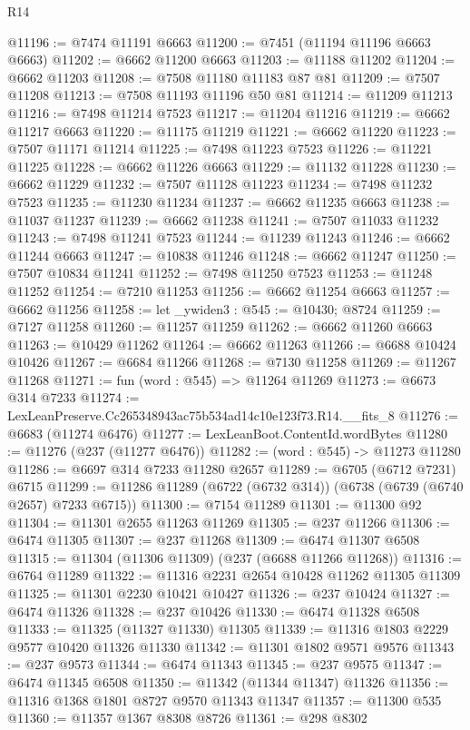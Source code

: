 \begin{lexlean}{R14}
\begin{coremodule}
@11196 := @7474 @11191 @6663
@11200 := @7451 (@11194 @11196 @6663 @6663)
@11202 := @6662 @11200 @6663
@11203 := @11188 @11202
@11204 := @6662 @11203
@11208 := @7508 @11180 @11183 @87 @81
@11209 := @7507 @11208
@11213 := @7508 @11193 @11196 @50 @81
@11214 := @11209 @11213
@11216 := @7498 @11214 @7523
@11217 := @11204 @11216
@11219 := @6662 @11217 @6663
@11220 := @11175 @11219
@11221 := @6662 @11220
@11223 := @7507 @11171 @11214
@11225 := @7498 @11223 @7523
@11226 := @11221 @11225
@11228 := @6662 @11226 @6663
@11229 := @11132 @11228
@11230 := @6662 @11229
@11232 := @7507 @11128 @11223
@11234 := @7498 @11232 @7523
@11235 := @11230 @11234
@11237 := @6662 @11235 @6663
@11238 := @11037 @11237
@11239 := @6662 @11238
@11241 := @7507 @11033 @11232
@11243 := @7498 @11241 @7523
@11244 := @11239 @11243
@11246 := @6662 @11244 @6663
@11247 := @10838 @11246
@11248 := @6662 @11247
@11250 := @7507 @10834 @11241
@11252 := @7498 @11250 @7523
@11253 := @11248 @11252
@11254 := @7210 @11253
@11256 := @6662 @11254 @6663
@11257 := @6662 @11256
@11258 := let _ywiden3 : @545 := @10430; @8724
@11259 := @7127 @11258
@11260 := @11257 @11259
@11262 := @6662 @11260 @6663
@11263 := @10429 @11262
@11264 := @6662 @11263
@11266 := @6688 @10424 @10426
@11267 := @6684 @11266
@11268 := @7130 @11258
@11269 := @11267 @11268
@11271 := fun (word : @545) => @11264 @11269
@11273 := @6673 @314 @7233
@11274 := LexLeanPreserve.Cc265348943ac75b534ad14c10e123f73.R14.__fits_8
@11276 := @6683 (@11274 @6476)
@11277 := LexLeanBoot.ContentId.wordBytes
@11280 := @11276 (@237 (@11277 @6476))
@11282 := (word : @545) -> @11273 @11280
@11286 := @6697 @314 @7233 @11280 @2657
@11289 := @6705 (@6712 @7231) @6715
@11299 := @11286 @11289 (@6722 (@6732 @314)) (@6738 (@6739 (@6740 @2657) @7233 @6715))
@11300 := @7154 @11289
@11301 := @11300 @92
@11304 := @11301 @2655 @11263 @11269
@11305 := @237 @11266
@11306 := @6474 @11305
@11307 := @237 @11268
@11309 := @6474 @11307 @6508
@11315 := @11304 (@11306 @11309) (@237 (@6688 @11266 @11268))
@11316 := @6764 @11289
@11322 := @11316 @2231 @2654 @10428 @11262 @11305 @11309
@11325 := @11301 @2230 @10421 @10427
@11326 := @237 @10424
@11327 := @6474 @11326
@11328 := @237 @10426
@11330 := @6474 @11328 @6508
@11333 := @11325 (@11327 @11330) @11305
@11339 := @11316 @1803 @2229 @9577 @10420 @11326 @11330
@11342 := @11301 @1802 @9571 @9576
@11343 := @237 @9573
@11344 := @6474 @11343
@11345 := @237 @9575
@11347 := @6474 @11345 @6508
@11350 := @11342 (@11344 @11347) @11326
@11356 := @11316 @1368 @1801 @8727 @9570 @11343 @11347
@11357 := @11300 @535
@11360 := @11357 @1367 @8308 @8726
@11361 := @298 @8302

\end{coremodule}
\end{lexlean}
